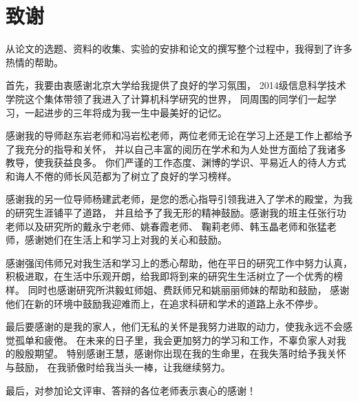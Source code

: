 \chapter{致谢}
从论文的选题、资料的收集、实验的安排和论文的撰写整个过程中，我得到了许多热情的帮助。

首先，我要由衷感谢北京大学给我提供了良好的学习氛围，
2014级信息科学技术学院这个集体带领了我进入了计算机科学研究的世界，
同周围的同学们一起学习，一起进步的三年将成为我一生中最美好的记忆。

感谢我的导师赵东岩老师和冯岩松老师，两位老师无论在学习上还是工作上都给予了我充分的指导和关怀，
并以自己丰富的阅历在学术和为人处世方面给了我诸多教导，使我获益良多。
你们严谨的工作态度、渊博的学识、平易近人的待人方式和诲人不倦的师长风范都为了树立了良好的学习榜样。

感谢我的另一位导师杨建武老师，是您的悉心指导引领我进入了学术的殿堂，为我的研究生涯铺平了道路，
并且给予了我无形的精神鼓励。感谢我的班主任张行功老师以及研究所的戴永宁老师、姚春霞老师、 鞠莉老师、韩玉晶老师和张猛老师，感谢她们在生活上和学习上对我的关心和鼓励。

感谢强闰伟师兄对我生活和学习上的悉心帮助，他在平日的研究工作中努力认真，
积极进取，在生活中乐观开朗，给我即将到来的研究生生活树立了一个优秀的榜样。
同时也感谢研究所洪毅虹师姐、费跃师兄和姚丽丽师妹的帮助和鼓励，
感谢他们在新的环境中鼓励我迎难而上，在追求科研和学术的道路上永不停步。

最后要感谢的是我的家人，他们无私的关怀是我努力进取的动力，使我永远不会感觉孤单和疲倦。
在未来的日子里，我会更加努力的学习和工作，不辜负家人对我的殷殷期望。
特别感谢王慧，感谢你出现在我的生命里，在我失落时给予我关怀与鼓励，
在我骄傲时给我当头一棒，让我继续努力。

最后，对参加论文评审、答辩的各位老师表示衷心的感谢！


